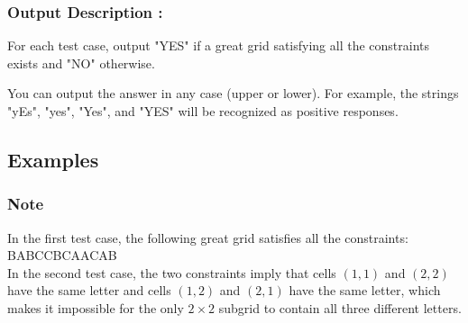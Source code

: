 \documentclass{article}
\begin{document}
\paragraph{}
\subsubsection*{Output Description : }For each test case, output "YES" if a great grid satisfying all the constraints exists and "NO" otherwise.

You can output the answer in any case (upper or lower). For example, the strings "yEs", "yes", "Yes", and "YES" will be recognized as positive responses.
\subsection*{Examples}
\subsubsection*{Note}In the first test case, the following great grid satisfies all the constraints: BABCCBCAACAB\\ In the second test case, the two constraints imply that cells $(1,1)$ and $(2,2)$ have the same letter and cells $(1,2)$ and $(2,1)$ have the same letter, which makes it impossible for the only $2 \times 2$ subgrid to contain all three different letters.
\newpage
\end{document}
